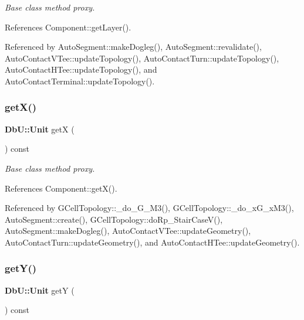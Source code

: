 {\itshape Base class method proxy.} 

References Component\+::get\+Layer().



Referenced by Auto\+Segment\+::make\+Dogleg(), Auto\+Segment\+::revalidate(), Auto\+Contact\+V\+Tee\+::update\+Topology(), Auto\+Contact\+Turn\+::update\+Topology(), Auto\+Contact\+H\+Tee\+::update\+Topology(), and Auto\+Contact\+Terminal\+::update\+Topology().

\mbox{\label{classKatabatic_1_1AutoContact_a00b8f54c8171f6699e57de1b8c18eeb1}} 
\subsubsection{\texorpdfstring{get\+X()}{getX()}}
{\footnotesize\ttfamily \textbf{ Db\+U\+::\+Unit} getX (\begin{DoxyParamCaption}{ }\end{DoxyParamCaption}) const\hspace{0.3cm}{\ttfamily [inline]}}

{\itshape Base class method proxy.} 

References Component\+::get\+X().



Referenced by G\+Cell\+Topology\+::\+\_\+do\+\_\+G\+\_\+M3(), G\+Cell\+Topology\+::\+\_\+do\+\_\+x\+G\+\_\+x\+M3(), Auto\+Segment\+::create(), G\+Cell\+Topology\+::do\+Rp\+\_\+\+Stair\+Case\+V(), Auto\+Segment\+::make\+Dogleg(), Auto\+Contact\+V\+Tee\+::update\+Geometry(), Auto\+Contact\+Turn\+::update\+Geometry(), and Auto\+Contact\+H\+Tee\+::update\+Geometry().

\mbox{\label{classKatabatic_1_1AutoContact_a4580de6b074712e400d5d238ce3af054}} 
\subsubsection{\texorpdfstring{get\+Y()}{getY()}}
{\footnotesize\ttfamily \textbf{ Db\+U\+::\+Unit} getY (\begin{DoxyParamCaption}{ }\end{DoxyParamCaption}) const\hspace{0.3cm}{\ttfamily [inline]}}

